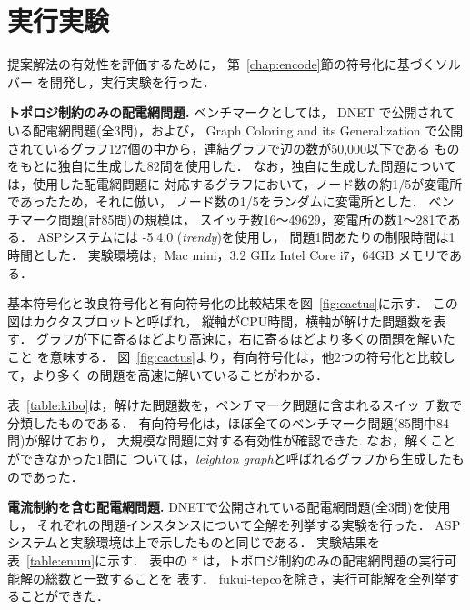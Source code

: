 \section{実行実験}\label{chap:exp}


提案解法の有効性を評価するために，
第~\ref{chap:encode}節の符号化に基づくソルバー
を開発し，実行実験を行った．

\textbf{トポロジ制約のみの配電網問題.}
ベンチマークとしては，
DNET%
で公開されている配電網問題(全3問)，および，
Graph Coloring and its Generalization%
で公開されているグラフ127個の中から，連結グラフで辺の数が50,000以下である
ものをもとに独自に生成した82問を使用した．
なお，独自に生成した問題については，使用した配電網問題に
対応するグラフにおいて，ノード数の約1/5が変電所であったため，それに倣い，
ノード数の1/5をランダムに変電所とした．
ベンチマーク問題(計85問)の規模は，
スイッチ数16〜49629，変電所の数1〜281である．
%
ASPシステムには {\clingo}-5.4.0 (\textit{trendy})を使用し，
問題1問あたりの制限時間は1時間とした．
実験環境は，Mac mini，3.2 GHz Intel Core i7，64GB メモリである．

基本符号化と改良符号化と有向符号化の比較結果を図~\ref{fig:cactus}に示す．
この図はカクタスプロットと呼ばれ，
縦軸がCPU時間，横軸が解けた問題数を表す．
グラフが下に寄るほどより高速に，右に寄るほどより多くの問題を解いたこと
を意味する．
図~\ref{fig:cactus}より，有向符号化は，他2つの符号化と比較して，より多く
の問題を高速に解いていることがわかる．

表~\ref{table:kibo}は，解けた問題数を，ベンチマーク問題に含まれるスイッ
チ数で分類したものである．
有向符号化は，ほぼ全てのベンチマーク問題(85問中84問)が解けており，
大規模な問題に対する有効性が確認できた. なお，解くことができなかった1問に
ついては，\textit{leighton graph}と呼ばれるグラフから生成したものであった．

\textbf{電流制約を含む配電網問題.}
DNETで公開されている配電網問題(全3問)を使用し，
それぞれの問題インスタンスについて全解を列挙する実験を行った．
ASPシステムと実験環境は上で示したものと同じである．
実験結果を表~\ref{table:enum}に示す．
表中の * は，トポロジ制約のみの配電網問題の実行可能解の総数と一致することを
表す．
\textsf{fukui-tepco}を除き，実行可能解を全列挙することができた．

